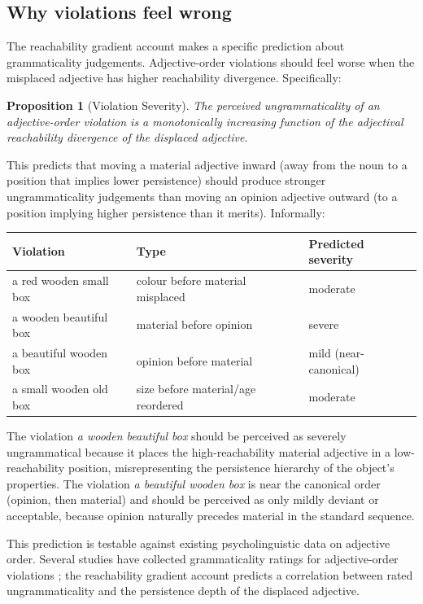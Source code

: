 \documentclass[11pt]{article}
\theoremstyle{rthm}
\newtheorem{proposition}[theorem]{Proposition}
\theoremstyle{rdef}
\theoremstyle{remark}
\begin{document}
\subsection{Why violations feel wrong}

The reachability gradient account makes a specific prediction about
grammaticality judgements. Adjective-order violations should feel worse
when the misplaced adjective has higher reachability divergence. Specifically:

\begin{proposition}[Violation Severity]
\label{prop:severity}
The perceived ungrammaticality of an adjective-order violation is a
monotonically increasing function of the adjectival reachability divergence
of the displaced adjective.
\end{proposition}

This predicts that moving a material adjective inward (away from the noun
to a position that implies lower persistence) should produce stronger
ungrammaticality judgements than moving an opinion adjective outward (to a
position implying higher persistence than it merits). Informally:

\begin{center}
\begin{tabular}{lll}
\toprule
\textbf{Violation} & \textbf{Type} & \textbf{Predicted severity} \\
\midrule
a red wooden small box & colour before material misplaced & moderate \\
a wooden beautiful box & material before opinion & severe \\
a beautiful wooden box & opinion before material & mild (near-canonical) \\
a small wooden old box & size before material/age reordered & moderate \\
\bottomrule
\end{tabular}
\end{center}

The violation \emph{a wooden beautiful box} should be perceived as severely
ungrammatical because it places the high-reachability material adjective in
a low-reachability position, misrepresenting the persistence hierarchy of
the object's properties. The violation \emph{a beautiful wooden box}
is near the canonical order (opinion, then material) and should be perceived
as only mildly deviant or acceptable, because opinion naturally precedes
material in the standard sequence.

This prediction is testable against existing psycholinguistic data on
adjective order. Several studies have collected grammaticality ratings for
adjective-order violations \cite{whorf1956,martin1969,scott2002,cinque1994};
the reachability gradient account predicts a correlation between rated
ungrammaticality and the persistence depth of the displaced adjective.
\end{document}
